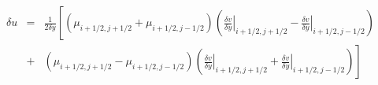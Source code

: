 \documentclass[11pt,a4paper]{article}
\begin{document}
\begin{eqnarray}
\delta u & = & \frac 1 {2 \delta y} \left[  \left( \mu_{i+1/2,j+1/2}  + \mu_{i+1/2,j-1/2}
\right) \left( \left.\frac {\delta v }{\delta y}\right\vert_{i+1/2,j+1/2} - \left.\frac {\delta v }{\delta y}\right\vert_{i+1/2,j-1/2}\right)\right.\nonumber \\
& + &  \left.\left( \mu_{i+1/2,j+1/2}  - \mu_{i+1/2,j-1/2} \right) 
\left( \left.\frac {\delta v }{\delta y}\right\vert_{i+1/2,j+1/2} + \left.\frac {\delta v }{\delta y}\right\vert_{i+1/2,j-1/2}\right)\right]
\end{eqnarray}
\end{document}
